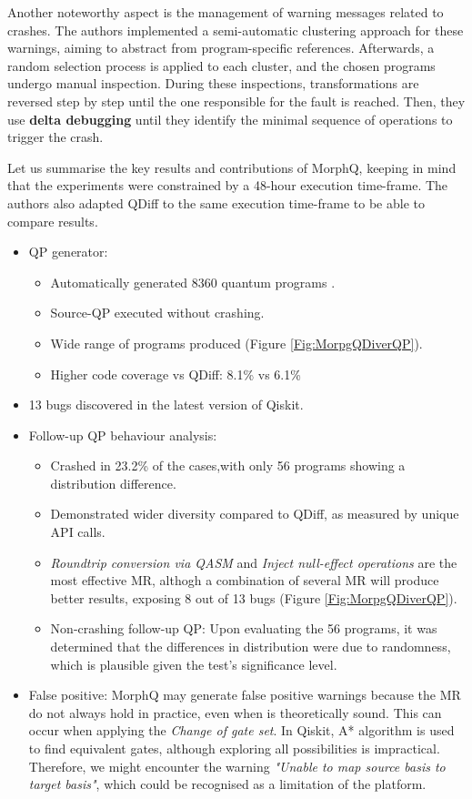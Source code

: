 \begin{itemize}
Another noteworthy aspect is the management of warning messages related to crashes. The authors implemented a semi-automatic clustering approach for these warnings, aiming to abstract from program-specific references. Afterwards, a random selection process is applied to each cluster, and the chosen programs undergo manual inspection. During these inspections, transformations are reversed step by step until the one responsible for the fault is reached. Then, they use \textbf{delta debugging} until they identify the minimal sequence of operations to trigger the crash. \newline

Let us summarise the key results and contributions of MorphQ, keeping in mind that the experiments were constrained by a 48-hour execution time-frame. The authors also adapted QDiff to the same execution time-frame to be able to compare results.

\begin{itemize}
    \item QP generator:
    \begin{itemize}
        \item Automatically generated 8360 quantum programs .
        \item Source-QP executed without crashing.
        \item Wide range of programs produced (Figure \ref{Fig:MorpgQDiverQP}). 
        \item Higher code coverage vs QDiff: 8.1\% vs 6.1\% 
    \end{itemize}
    \item 13 bugs discovered in the latest version of Qiskit.
    \item Follow-up QP behaviour analysis:
    \begin{itemize}
        \item Crashed in 23.2\% of the cases,with only 56 programs showing a distribution difference.
        \item Demonstrated wider diversity compared to QDiff, as measured by unique API calls.
        \item \textit{Roundtrip conversion via QASM} and \textit{Inject null-effect operations} are the most effective MR, althogh a combination of several MR will produce better results, exposing 8 out of 13 bugs (Figure \ref{Fig:MorpgQDiverQP}). 
        \item Non-crashing follow-up QP: Upon evaluating the 56 programs, it was determined that the differences in distribution were due to randomness, which is plausible given the test's significance level.
    \end{itemize}
    \item False positive: MorphQ may generate false positive warnings because the MR do not always hold in practice, even when is theoretically sound. This can occur when applying the \textit{Change of gate set}. In Qiskit, A* algorithm is used to find equivalent gates, although exploring all possibilities is impractical. Therefore, we might encounter the warning \textit{"Unable to map source basis to target basis"}, which  could be recognised as a limitation of the platform.
\end{itemize}


\end{itemize}
